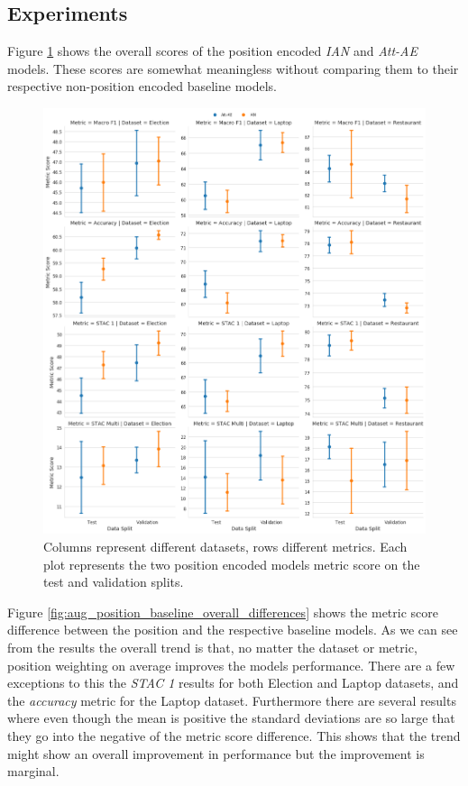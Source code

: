 \subsection{Experiments}

Figure \ref{fig:aug_overall_position_scores} shows the overall scores of the position encoded \textit{IAN} and \textit{Att-AE} models. These scores are somewhat meaningless without comparing them to their respective non-position encoded baseline models.

\begin{figure}[h!]
    \centering
    \includegraphics[scale=0.32]{images/augmentation/methods_performance/Position_Encoding/overall_position_scores.png}
    \caption{Columns represent different datasets, rows different metrics. Each plot represents the two position encoded models metric score on the test and validation splits.}
    \label{fig:aug_overall_position_scores}
\end{figure}

Figure \ref{fig:aug_position_baseline_overall_differences} shows the metric score difference between the position and the respective baseline models. As we can see from the results the overall trend is that, no matter the dataset or metric, position weighting on average improves the models performance. There are a few exceptions to this the \textit{STAC 1} results for both Election and Laptop datasets, and the \textit{accuracy} metric for the Laptop dataset. Furthermore there are several results where even though the mean is positive the standard deviations are so large that they go into the negative of the metric score difference. This shows that the trend might show an overall improvement in performance but the improvement is marginal.

